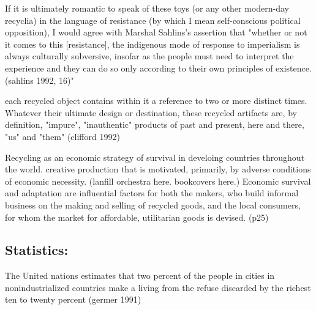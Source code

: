  If it is ultimately romantic to speak of these toys (or any other modern-day recyclia) in the language of resistance (by which I mean self-conscious political opposition), I would agree with Marshal Sahlins's assertion that "whether or not it comes to this [resistance], the indigenous mode of response to imperialism is always culturally subversive, insofar as the people must need to interpret the experience and they can do so only according to their own principles of existence. (sahlins 1992, 16)"

 each recycled object contains within it a reference to two or more distinct times.  Whatever their ultimate design or destination, these recycled artifacts are, by definition, "impure", "inauthentic" products of past and present, here and there, "us" and "them" (clifford 1992) 

 Recycling as an economic strategy of survival in develoing countries throughout the world. creative production that is motivated, primarily, by adverse conditions of economic necessity. (lanfill orchestra here. bookcovers here.) Economic survival and adaptation are influential factors for both the makers, who build informal business on the making and selling of recycled goods, and the local consumers, for whom the market for affordable, utilitarian goods is devised. (p25)

\subsection{Statistics:}
The United nations estimates that two percent of the people in cities in nonindustrialized countries make a living from the refuse discarded by the richest ten to twenty percent (germer 1991)


